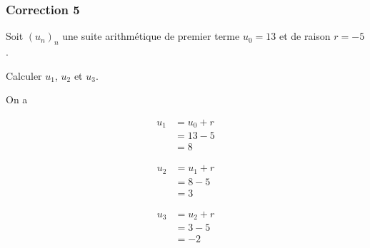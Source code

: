 \documentclass[15pt, mathserif]{beamer}
\begin{document}
\begin{frame}
\vspace{-10mm}
	\frametitle{Correction 5}
Soit $(u_n)_n$ une suite arithmétique de premier terme $u_0=13$ et de raison $r=-5$. 
 
 Calculer $u_1$, $u_2$ et $u_3$. 
 
 On a 
 \begin{minipage}{0.25\textwidth} 
 
 \begin{align*} 
 u_1 &= u_0+r \\ &= 13-5 \\ &=8
 \end{align*} 
  
 \end{minipage} \hfil \begin{minipage}{0.25\textwidth} 
 
 \begin{align*} 
 u_2 &= u_1+r \\ &= 8-5 \\ &=3
 \end{align*} 
 
 \end{minipage} \hfil \begin{minipage}{0.25\textwidth} 
 
 \begin{align*} 
 u_3 &= u_2+r \\ &= 3-5 \\ &=-2
 \end{align*} 
 
 \end{minipage} 
\end{frame}
\end{document}

